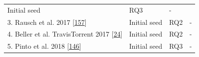 \documentclass[]{book}
\begin{document}
\begin{longtable}[]{@{}llll@{}}
\begin{minipage}[t]{0.20\columnwidth}
Initial seed\strut
\end{minipage} & \begin{minipage}[t]{0.14\columnwidth}\raggedright\strut
RQ3\strut
\end{minipage} & \begin{minipage}[t]{0.06\columnwidth}\raggedright\strut
-\strut
\end{minipage}\tabularnewline
\begin{minipage}[t]{0.48\columnwidth}\raggedright\strut
3. Rausch et al. 2017
{[}\protect\hyperlink{ref-rausch2017empirical}{157}{]}\strut
\end{minipage} & \begin{minipage}[t]{0.20\columnwidth}\raggedright\strut
Initial seed\strut
\end{minipage} & \begin{minipage}[t]{0.14\columnwidth}\raggedright\strut
RQ2\strut
\end{minipage} & \begin{minipage}[t]{0.06\columnwidth}\raggedright\strut
-\strut
\end{minipage}\tabularnewline
\begin{minipage}[t]{0.48\columnwidth}\raggedright\strut
4. Beller et al. TravisTorrent 2017
{[}\protect\hyperlink{ref-beller2017travistorrent}{24}{]}\strut
\end{minipage} & \begin{minipage}[t]{0.20\columnwidth}\raggedright\strut
Initial seed\strut
\end{minipage} & \begin{minipage}[t]{0.14\columnwidth}\raggedright\strut
RQ2\strut
\end{minipage} & \begin{minipage}[t]{0.06\columnwidth}\raggedright\strut
-\strut
\end{minipage}\tabularnewline
\begin{minipage}[t]{0.48\columnwidth}\raggedright\strut
5. Pinto et al. 2018
{[}\protect\hyperlink{ref-pinto2018work}{146}{]}\strut
\end{minipage} & \begin{minipage}[t]{0.20\columnwidth}\raggedright\strut
Initial seed\strut
\end{minipage} & \begin{minipage}[t]{0.14\columnwidth}\raggedright\strut
RQ3\strut
\end{minipage} & \begin{minipage}[t]{0.06\columnwidth}\raggedright\strut
-\strut
\end{minipage}\tabularnewline

\end{longtable}
\end{document}
